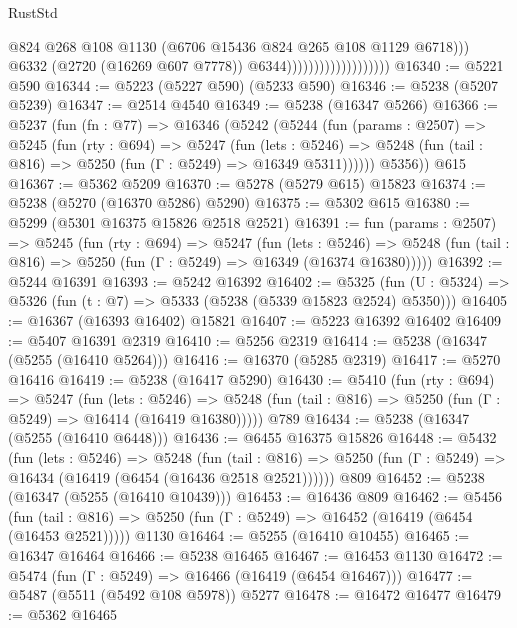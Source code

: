 \begin{lexlean}{RustStd}
\begin{coremodule}
                                              @824
                                              @268
                                              @108
                                              @1130
                                              (@6706 @15436 @824 @265 @108 @1129 @6718)))
                                          @6332
                                          (@2720 (@16269 @607 @7778))
                                          @6344)))))))))))))))))))
@16340 := @5221 @590
@16344 := @5223 (@5227 @590) (@5233 @590)
@16346 := @5238 (@5207 @5239)
@16347 := @2514 @4540
@16349 := @5238 (@16347 @5266)
@16366 := @5237
    (fun (fn : @77) =>
    @16346
      (@5242
        (@5244
          (fun (params : @2507) =>
          @5245
            (fun (rty : @694) =>
            @5247
              (fun (lets : @5246) =>
              @5248 (fun (tail : @816) => @5250 (fun (Γ : @5249) => @16349 @5311))))))
        @5356))
    @615
@16367 := @5362 @5209
@16370 := @5278 (@5279 @615) @15823
@16374 := @5238 (@5270 (@16370 @5286) @5290)
@16375 := @5302 @615
@16380 := @5299 (@5301 @16375 @15826 @2518 @2521)
@16391 := fun (params : @2507) =>
  @5245
    (fun (rty : @694) =>
    @5247
      (fun (lets : @5246) =>
      @5248 (fun (tail : @816) => @5250 (fun (Γ : @5249) => @16349 (@16374 @16380)))))
@16392 := @5244 @16391
@16393 := @5242 @16392
@16402 := @5325
    (fun (U : @5324) => @5326 (fun (t : @7) => @5333 (@5238 (@5339 @15823 @2524) @5350)))
@16405 := @16367 (@16393 @16402) @15821
@16407 := @5223 @16392 @16402
@16409 := @5407 @16391 @2319
@16410 := @5256 @2319
@16414 := @5238 (@16347 (@5255 (@16410 @5264)))
@16416 := @16370 (@5285 @2319)
@16417 := @5270 @16416
@16419 := @5238 (@16417 @5290)
@16430 := @5410
    (fun (rty : @694) =>
    @5247
      (fun (lets : @5246) =>
      @5248 (fun (tail : @816) => @5250 (fun (Γ : @5249) => @16414 (@16419 @16380)))))
    @789
@16434 := @5238 (@16347 (@5255 (@16410 @6448)))
@16436 := @6455 @16375 @15826
@16448 := @5432
    (fun (lets : @5246) =>
    @5248
      (fun (tail : @816) =>
      @5250 (fun (Γ : @5249) => @16434 (@16419 (@6454 (@16436 @2518 @2521))))))
    @809
@16452 := @5238 (@16347 (@5255 (@16410 @10439)))
@16453 := @16436 @809
@16462 := @5456
    (fun (tail : @816) => @5250 (fun (Γ : @5249) => @16452 (@16419 (@6454 (@16453 @2521)))))
    @1130
@16464 := @5255 (@16410 @10455)
@16465 := @16347 @16464
@16466 := @5238 @16465
@16467 := @16453 @1130
@16472 := @5474 (fun (Γ : @5249) => @16466 (@16419 (@6454 @16467)))
@16477 := @5487 (@5511 (@5492 @108 @5978)) @5277
@16478 := @16472 @16477
@16479 := @5362 @16465

\end{coremodule}
\end{lexlean}
